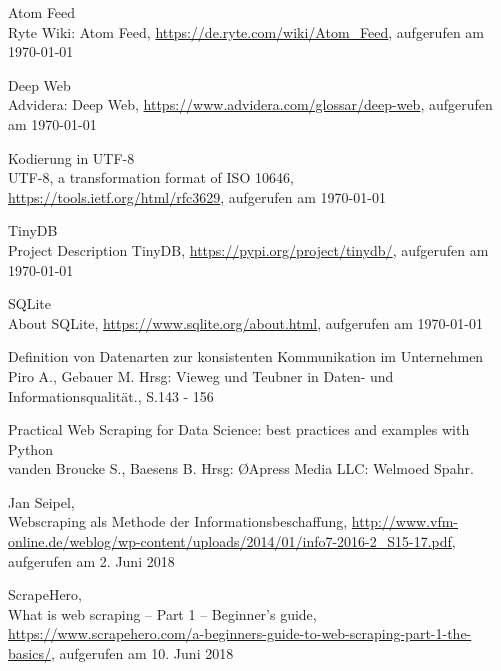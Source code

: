 \documentclass[a4paper,oneside,12pt]{report}
\begin{document}
	\clearpage
	\begin{thebibliography}{9} 
		\vspace{1.0cm}
		
		 Atom Feed\\ Ryte Wiki: Atom Feed, \newline \url{https://de.ryte.com/wiki/Atom_Feed}, aufgerufen am \today
					
		 Deep Web\\ Advidera: Deep Web, \newline \url{https://www.advidera.com/glossar/deep-web}, aufgerufen am \today	
		
		 Kodierung in UTF-8\\ UTF-8, a transformation format of ISO 10646, \newline \url{https://tools.ietf.org/html/rfc3629}, aufgerufen am \today
		
		 TinyDB\\ Project Description TinyDB, \newline \url{https://pypi.org/project/tinydb/}, aufgerufen am \today
		
		 SQLite\\ About SQLite, \newline \url{https://www.sqlite.org/about.html}, aufgerufen am \today
		
		 Definition von Datenarten zur konsistenten Kommunikation im Unternehmen\\ Piro A., Gebauer M. Hrsg: \glqq Vieweg und Teubner in Daten- und Informationsqualität.\grqq, S.143 - 156
		
		 Practical Web Scraping for Data Science: best practices and examples with Python\\ vanden Broucke S., Baesens B. Hrsg: \glqq \O Apress Media LLC: Welmoed Spahr.\grqq
		
		 Jan Seipel,\\ Webscraping als Methode der Informationsbeschaffung, \newline \url{http://www.vfm-online.de/weblog/wp-content/uploads/2014/01/info7-2016-2\_S15-17.pdf}, aufgerufen am 2. Juni 2018
		
		 ScrapeHero,\\What is web scraping – Part 1 – Beginner’s guide, \url{https://www.scrapehero.com/a-beginners-guide-to-web-scraping-part-1-the-basics/}, aufgerufen am 10. Juni 2018
		

\end{thebibliography}
\end{document}
